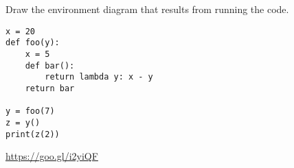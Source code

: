 \begin{blocksection}
\question Draw the environment diagram that results from running the code.

\begin{lstlisting}
x = 20
def foo(y):
    x = 5
    def bar():
        return lambda y: x - y
    return bar

y = foo(7)
z = y()
print(z(2))
\end{lstlisting}

\begin{solution}[2in]
\url{https://goo.gl/i2yiQF}
\end{solution}
\end{blocksection}
